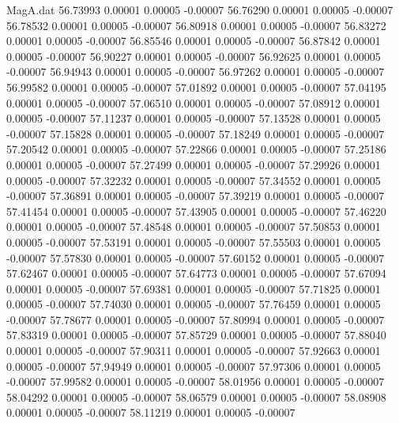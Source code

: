 \begin{filecontents}{MagA.dat}
  56.73993    0.00001    0.00005   -0.00007
  56.76290    0.00001    0.00005   -0.00007
  56.78532    0.00001    0.00005   -0.00007
  56.80918    0.00001    0.00005   -0.00007
  56.83272    0.00001    0.00005   -0.00007
  56.85546    0.00001    0.00005   -0.00007
  56.87842    0.00001    0.00005   -0.00007
  56.90227    0.00001    0.00005   -0.00007
  56.92625    0.00001    0.00005   -0.00007
  56.94943    0.00001    0.00005   -0.00007
  56.97262    0.00001    0.00005   -0.00007
  56.99582    0.00001    0.00005   -0.00007
  57.01892    0.00001    0.00005   -0.00007
  57.04195    0.00001    0.00005   -0.00007
  57.06510    0.00001    0.00005   -0.00007
  57.08912    0.00001    0.00005   -0.00007
  57.11237    0.00001    0.00005   -0.00007
  57.13528    0.00001    0.00005   -0.00007
  57.15828    0.00001    0.00005   -0.00007
  57.18249    0.00001    0.00005   -0.00007
  57.20542    0.00001    0.00005   -0.00007
  57.22866    0.00001    0.00005   -0.00007
  57.25186    0.00001    0.00005   -0.00007
  57.27499    0.00001    0.00005   -0.00007
  57.29926    0.00001    0.00005   -0.00007
  57.32232    0.00001    0.00005   -0.00007
  57.34552    0.00001    0.00005   -0.00007
  57.36891    0.00001    0.00005   -0.00007
  57.39219    0.00001    0.00005   -0.00007
  57.41454    0.00001    0.00005   -0.00007
  57.43905    0.00001    0.00005   -0.00007
  57.46220    0.00001    0.00005   -0.00007
  57.48548    0.00001    0.00005   -0.00007
  57.50853    0.00001    0.00005   -0.00007
  57.53191    0.00001    0.00005   -0.00007
  57.55503    0.00001    0.00005   -0.00007
  57.57830    0.00001    0.00005   -0.00007
  57.60152    0.00001    0.00005   -0.00007
  57.62467    0.00001    0.00005   -0.00007
  57.64773    0.00001    0.00005   -0.00007
  57.67094    0.00001    0.00005   -0.00007
  57.69381    0.00001    0.00005   -0.00007
  57.71825    0.00001    0.00005   -0.00007
  57.74030    0.00001    0.00005   -0.00007
  57.76459    0.00001    0.00005   -0.00007
  57.78677    0.00001    0.00005   -0.00007
  57.80994    0.00001    0.00005   -0.00007
  57.83319    0.00001    0.00005   -0.00007
  57.85729    0.00001    0.00005   -0.00007
  57.88040    0.00001    0.00005   -0.00007
  57.90311    0.00001    0.00005   -0.00007
  57.92663    0.00001    0.00005   -0.00007
  57.94949    0.00001    0.00005   -0.00007
  57.97306    0.00001    0.00005   -0.00007
  57.99582    0.00001    0.00005   -0.00007
  58.01956    0.00001    0.00005   -0.00007
  58.04292    0.00001    0.00005   -0.00007
  58.06579    0.00001    0.00005   -0.00007
  58.08908    0.00001    0.00005   -0.00007
  58.11219    0.00001    0.00005   -0.00007

\end{filecontents}
